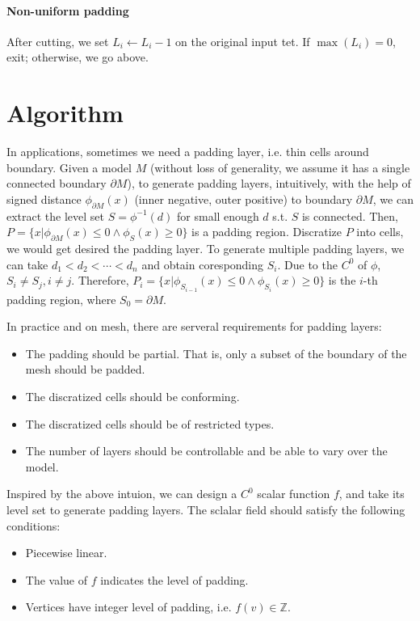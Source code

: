 \documentclass[9pt]{extarticle}
\begin{document}
\paragraph*{Non-uniform padding}
After cutting, we set $L_i \leftarrow L_i-1$ on the original input
tet.  If $\max(L_i)=0$, exit; otherwise, we go above.

\section{Algorithm}
In applications, sometimes we need a padding layer, i.e. thin cells around
boundary. Given a model $M$ (without loss of generality, we assume it has a
single connected boundary $\partial M$), to generate padding layers,
intuitively, with the help of signed distance $\phi_{\partial M}(x)$ (inner
negative, outer positive) to boundary $\partial M$, we can extract the
level set $S=\phi^{-1}(d)$ for small enough $d$ s.t. $S$ is connected.
Then, $P=\{x|\phi_{\partial M}(x)\le 0 \wedge  \phi_{S}(x)\ge 0\}$ is a
padding region. Discratize $P$ into cells, we would get desired the padding
layer. To generate multiple padding layers, we can take
$d_1<d_2<\cdots<d_n$ and obtain coresponding $S_i$. Due to the $C^0$ of
$\phi$, $S_i\ne S_j,i\ne j$. Therefore, $P_i=\{x|\phi_{S_{i-1}}(x)\le 0
  \wedge  \phi_{S_i}(x)\ge 0\}$ is the $i$-th padding region, where
$S_0=\partial M$.

In practice and on mesh, there are serveral requirements for padding
layers:
\begin{itemize}
  \item The padding should be partial. That is, only a subset of the
        boundary of the mesh should be padded.
  \item The discratized cells should be conforming.
  \item The discratized cells should be of restricted types.
  \item The number of layers should be controllable and be able to vary
        over the model.
\end{itemize}
Inspired by the above intuion, we can design a $C^0$ scalar function $f$, and take its level set to generate padding layers. The sclalar field should satisfy the following conditions:
\begin{itemize}
  \item Piecewise linear.
  \item The value of $f$ indicates the level of padding.
  \item Vertices have integer level of padding, i.e. $f(v)\in
          \mathbb{Z}$.
\end{itemize}
\end{document}
